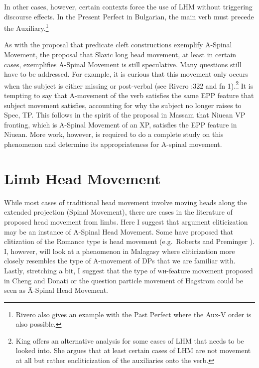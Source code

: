 \documentclass[output=paper,colorlinks,citecolor=brown,
]{langscibook}
\begin{document}
In other cases, however, certain contexts force the use of LHM without triggering discourse effects.  In the Present Perfect in Bulgarian, the main verb must precede the Auxiliary.\footnote{Rivero \citeyear{Rivero:1994} also gives an example with the Past Perfect where the Aux-V order is also possible.}

\ea
    \z
\z

As with the proposal that predicate cleft constructions exemplify \=A-Spinal Movement, the proposal that Slavic long head movement, at least in certain cases, exemplifies A-Spinal Movement is still speculative.  Many questions still have to be addressed.  For example, it is curious that this movement only occurs when the subject is either missing or post-verbal (see Rivero \citeyear{Rivero:1994}:322 and fn 1).\footnote{King \citeyearpar{King:1996} offers an alternative analysis for some cases of LHM that needs to be looked into.  She argues that at least certain cases of LHM are not movement at all but rather encliticization of the auxiliaries onto the verb.}   It is tempting to say that A-movement of the verb satisfies the same EPP feature that subject movement satisfies, accounting for why the subject no longer raises to Spec, TP.  This follows in the spirit of the proposal in Massam \citeyearpar{Massam:2001a} that Niuean VP fronting, which is A-Spinal Movement of an XP, satisfies the EPP feature in Niuean.  More work, however, is required to do a complete study on this phenomenon and determine its appropriateness for A-spinal movement.

\section{Limb Head Movement}

 While most cases of traditional head movement involve moving heads along the extended projection (Spinal Movement), there are cases in the literature of proposed head movement from limbs.  Here I suggest that argument cliticization may be an instance of A-Spinal Head Movement.  Some have proposed that clitization of the Romance type is head movement (e.g.\ Roberts \citeyearpar{Roberts:2010} and Preminger \citeyearpar{Preminger:2019}). I, however, will look at a phenomenon in Malagasy where cliticization more closely resembles the type of A-movement of DPs that we are familiar with.  Lastly, stretching a bit, I suggest that the type of \textsc{wh}-feature movement proposed in Cheng \citeyearpar{Cheng:2000b} and Donati \citeyearpar{Donati:2006} or the question particle movement of Hagstrom \citeyearpar{Hagstrom:2000} could be seen as \=A-Spinal Head Movement.
\end{document}
